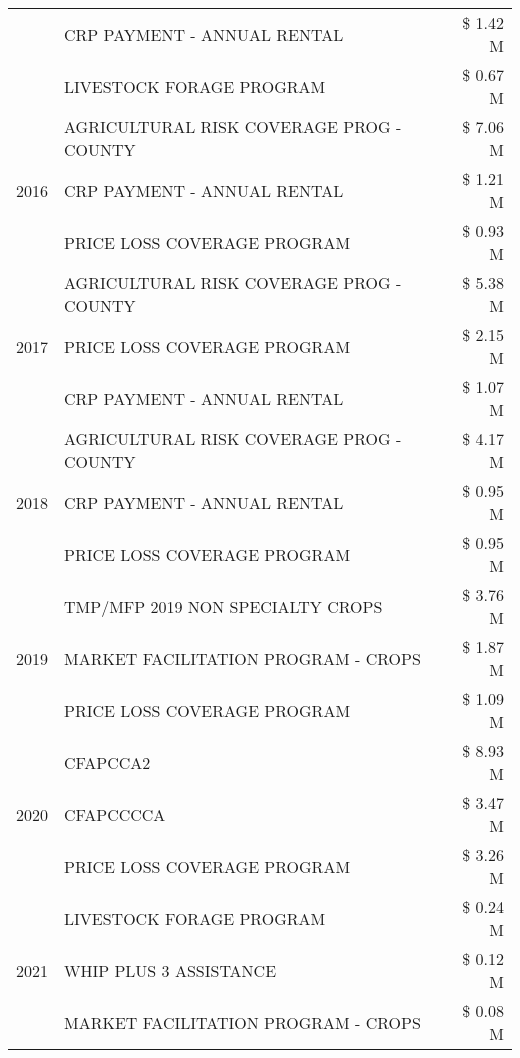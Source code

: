 \begin{tabular}{llr}
 & CRP PAYMENT - ANNUAL RENTAL & \$ 1.42 M \\
 & LIVESTOCK FORAGE PROGRAM & \$ 0.67 M \\
\cline{1-3}
\multirow[t]{3}{*}{2016} & AGRICULTURAL RISK COVERAGE PROG - COUNTY & \$ 7.06 M \\
 & CRP PAYMENT - ANNUAL RENTAL & \$ 1.21 M \\
 & PRICE LOSS COVERAGE PROGRAM & \$ 0.93 M \\
\cline{1-3}
\multirow[t]{3}{*}{2017} & AGRICULTURAL RISK COVERAGE PROG - COUNTY & \$ 5.38 M \\
 & PRICE LOSS COVERAGE PROGRAM & \$ 2.15 M \\
 & CRP PAYMENT - ANNUAL RENTAL & \$ 1.07 M \\
\cline{1-3}
\multirow[t]{3}{*}{2018} & AGRICULTURAL RISK COVERAGE PROG - COUNTY & \$ 4.17 M \\
 & CRP PAYMENT - ANNUAL RENTAL & \$ 0.95 M \\
 & PRICE LOSS COVERAGE PROGRAM & \$ 0.95 M \\
\cline{1-3}
\multirow[t]{3}{*}{2019} & TMP/MFP 2019 NON SPECIALTY CROPS & \$ 3.76 M \\
 & MARKET FACILITATION PROGRAM - CROPS & \$ 1.87 M \\
 & PRICE LOSS COVERAGE PROGRAM & \$ 1.09 M \\
\cline{1-3}
\multirow[t]{3}{*}{2020} & CFAPCCA2 & \$ 8.93 M \\
 & CFAPCCCCA & \$ 3.47 M \\
 & PRICE LOSS COVERAGE PROGRAM & \$ 3.26 M \\
\cline{1-3}
\multirow[t]{3}{*}{2021} & LIVESTOCK FORAGE PROGRAM & \$ 0.24 M \\
 & WHIP PLUS 3 ASSISTANCE & \$ 0.12 M \\
 & MARKET FACILITATION PROGRAM - CROPS & \$ 0.08 M \\
\cline{1-3}
\bottomrule
\end{tabular}
